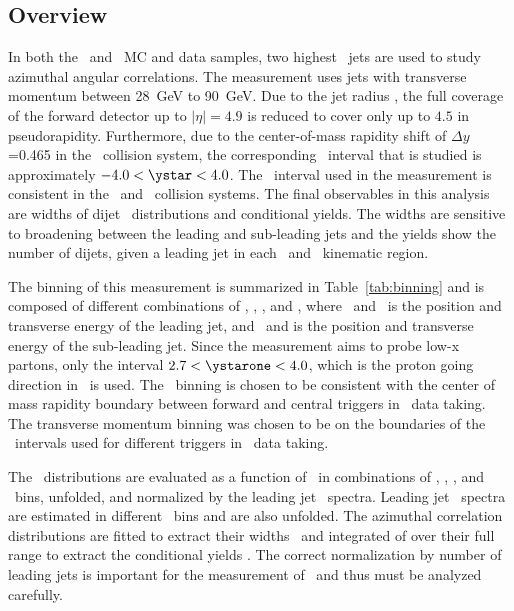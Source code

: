 \subsection{Overview}
In both the \pp\ and \pPb\ MC and data samples, two highest \pt\ jets are used to study azimuthal angular correlations. The measurement uses jets with transverse momentum between 28~GeV to 90~GeV. Due to the jet radius \RFour, the full coverage of the forward detector up to $|\eta|=4.9$ is reduced to cover only up to $4.5$ in pseudorapidity. Furthermore, due to the center-of-mass rapidity shift of $\Delta y$=0.465 in the \pPb\ collision system, the corresponding \ystar\ interval that is studied is approximately $-4.0<\ystar<4.0$. The \ystar\ interval used in the measurement is consistent in the \pp\ and \pPb\ collision systems. The final observables in this analysis are widths of dijet \conetwo\ distributions and conditional yields. The widths are sensitive to broadening between the leading and sub-leading jets and the yields show the number of dijets, given a leading jet in each \pT\ and \ystar\ kinematic region. 

The binning of this measurement is summarized in  Table~\ref{tab:binning} and is composed of different combinations of \ystarone, \ystartwo, \ptone, and \pttwo, where \ystarone\ and \ptone\ is the position and transverse energy of the leading jet, and \ystartwo\ and \pttwo is the position and transverse energy of the sub-leading jet. Since the measurement aims to probe low-x partons, only the interval $2.7<\ystarone<4.0$, which is the proton going direction in \pPb\ is used. The \ystar\ binning is chosen to be consistent with the center of mass rapidity boundary between forward and central triggers in \pPb\ data taking. The transverse momentum binning was chosen to be on the boundaries of the \pt\ intervals used for different triggers in \pp\ data taking. 

The \conetwo\ distributions are evaluated as a function of \Dphi\ in combinations of \ystarone, \ystartwo, \ptone, and \pttwo\ bins, unfolded, and normalized by the leading jet \pt\ spectra. Leading jet \ptone\ spectra are estimated in different \ystarone\ bins and are also unfolded. The azimuthal correlation distributions are fitted to extract their widths  \wonetwo\ and integrated of over their full range to extract the conditional yields \ionetwo. The correct normalization by number of leading jets is important for the measurement of \ionetwo\ and thus must be analyzed carefully. 


